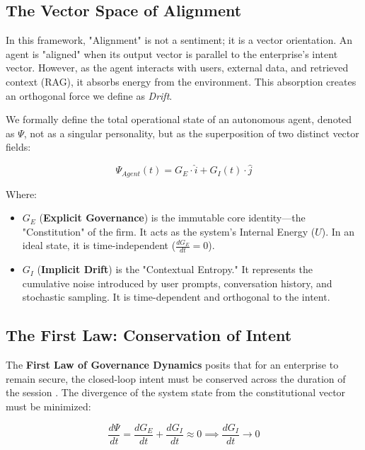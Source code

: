 \documentclass[11pt, a4paper]{article}
\newcommand{\Ge}{G_E}
\newcommand{\Gi}{G_I}
\begin{document}
\subsection{The Vector Space of Alignment}

In this framework, "Alignment" is not a sentiment; it is a vector orientation. An agent is "aligned" when its output vector is parallel to the enterprise's intent vector. However, as the agent interacts with users, external data, and retrieved context (RAG), it absorbs energy from the environment. This absorption creates an orthogonal force we define as \textit{Drift}.

We formally define the total operational state of an autonomous agent, denoted as $\Psi$, not as a singular personality, but as the superposition of two distinct vector fields:

\begin{equation}
    \label{eq:total_state}
    \Psi_{Agent}(t) = \Ge \cdot \hat{i} + \Gi(t) \cdot \hat{j}
\end{equation}

\noindent
Where:
\begin{itemize}
    \item $\Ge$ (\textbf{Explicit Governance}) is the immutable core identity—the "Constitution" of the firm. It acts as the system's Internal Energy ($U$). In an ideal state, it is time-independent ($\frac{d\Ge}{dt} = 0$).
    \item $\Gi$ (\textbf{Implicit Drift}) is the "Contextual Entropy." It represents the cumulative noise introduced by user prompts, conversation history, and stochastic sampling. It is time-dependent and orthogonal to the intent.
\end{itemize}

\subsection{The First Law: Conservation of Intent}

The \textbf{First Law of Governance Dynamics} posits that for an enterprise to remain secure, the closed-loop intent must be conserved across the duration of the session \cite{davis2026}. The divergence of the system state from the constitutional vector must be minimized:

\begin{equation}
    \label{eq:conservation}
    \frac{d\Psi}{dt} = \frac{d\Ge}{dt} + \frac{d\Gi}{dt} \approx 0 \implies \frac{d\Gi}{dt} \to 0
\end{equation}
\end{document}
